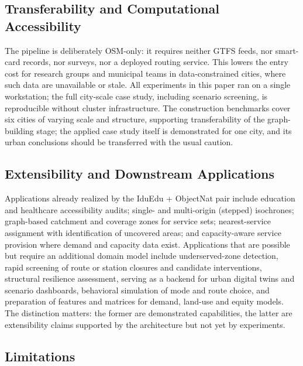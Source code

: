 \documentclass[smartcities,article,submit,moreauthors]{Definitions/mdpi}
\begin{document}
    \subsection{Transferability and Computational Accessibility}
    \label{subsec:disc-transferability}

    The pipeline is deliberately OSM-only: it requires neither GTFS feeds, nor smart-card records, nor
    surveys, nor a deployed routing service.
    This lowers the entry cost for research groups and municipal teams in data-constrained cities,
    where such data are unavailable or stale.
    All experiments in this paper ran on a single workstation; the full city-scale case study,
    including scenario screening, is reproducible without cluster infrastructure.
    The construction benchmarks cover six cities of varying scale and structure, supporting
    transferability of the graph-building stage; the applied case study itself is demonstrated for one
    city, and its urban conclusions should be transferred with the usual caution.

    \subsection{Extensibility and Downstream Applications}
    \label{subsec:disc-extensibility}

    Applications already realized by the IduEdu + ObjectNat pair include education and healthcare
    accessibility audits; single- and multi-origin (stepped) isochrones; graph-based catchment and
    coverage zones for service sets; nearest-service assignment with identification of uncovered areas;
    and capacity-aware service provision where demand and capacity data exist.
    Applications that are possible but require an additional domain model include underserved-zone
    detection, rapid screening of route or station closures and candidate interventions, structural
    resilience assessment, serving as a backend for urban digital twins and scenario dashboards,
    behavioral simulation of mode and route choice, and preparation of features and matrices for
    demand, land-use and equity models.
    The distinction matters: the former are demonstrated capabilities, the latter are extensibility
    claims supported by the architecture but not yet by experiments.

    \subsection{Limitations}
    \label{subsec:disc-limitations}
\end{document}
